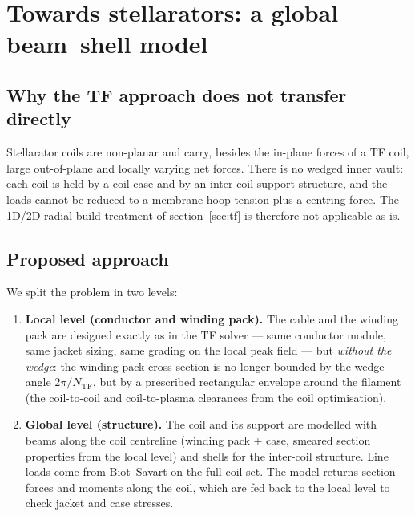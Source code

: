 \section{Towards stellarators: a global beam--shell model}
\label{sec:stellarator}

\subsection{Why the TF approach does not transfer directly}
Stellarator coils are non-planar and carry, besides the in-plane forces of
a TF coil, large out-of-plane and locally varying net forces. There is no
wedged inner vault: each coil is held by a coil case and by an
inter-coil support structure, and the loads cannot be reduced to a
membrane hoop tension plus a centring force. The 1D/2D radial-build
treatment of section~\ref{sec:tf} is therefore not applicable as is.

\subsection{Proposed approach}
We split the problem in two levels:
\begin{enumerate}
\item \textbf{Local level (conductor and winding pack).} The cable and the
winding pack are designed exactly as in the TF solver --- same conductor
module, same jacket sizing, same grading on the local peak field --- but
\emph{without the wedge}: the winding pack cross-section is no longer
bounded by the wedge angle $2\pi/N_\mathrm{TF}$, but by a prescribed
rectangular envelope around the filament (the coil-to-coil and
coil-to-plasma clearances from the coil optimisation).
\item \textbf{Global level (structure).} The coil and its support are
modelled with beams along the coil centreline (winding pack + case,
smeared section properties from the local level) and shells for the
inter-coil structure. Line loads come from Biot--Savart on the full coil
set. The model returns section forces and moments along the coil, which
are fed back to the local level to check jacket and case stresses.
\end{enumerate}


